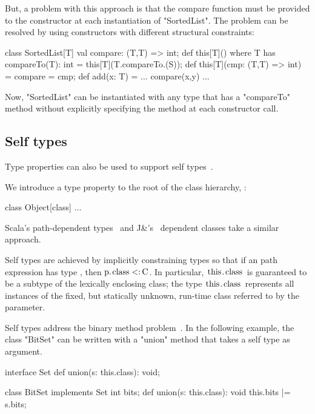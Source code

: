 \documentclass[preprint,nocopyrightspace,9pt]{sigplanconf}
\begin{document}
But, a problem with this approach is that the compare function must be
provided to the constructor at each instantiation of \xcd"SortedList".
The problem can be resolved by using constructors with different
structural constraints:
\begin{xten}
class SortedList[T] {
    val compare: (T,T) => int;
    def this[T]() where T has compareTo(T): int = {
        this[T](T.compareTo.(S));
    }
    def this[T](cmp: (T,T) => int) = { compare = cmp; }
    def add(x: T) = { ... compare(x,y) ... }
}
\end{xten}
Now, \xcd"SortedList" can be instantiated with any type that has
a \xcd"compareTo"
method without explicitly specifying the method at each constructor call.



\subsection{Self types}
\label{sec:self}

Type properties can also be used to support self
types~\cite{bruce-binary,bsg95}.

We introduce a 
type property  to the root of the class hierarchy, :
\begin{xtenmath}
class Object[class] { $\dots$ }
\end{xtenmath}
Scala's path-dependent types~\cite{scala} and J\&'s~\cite{nqm06}
dependent classes
take a similar approach.

\noindent
Self types are achieved by
implicitly constraining types so that if an path expression 
has type , then
$\Xcd{p}.\Xcd{class} \subtype \Xcd{C}$.  In particular,
$\Xcd{this}.\Xcd{class}$ is guaranteed to be a subtype
of the lexically enclosing class; the type
$\Xcd{this}.\Xcd{class}$ represents all instances of the fixed,
but statically unknown, run-time class referred to by the 
parameter.

Self types address the binary method problem~\cite{bruce-binary}.
In the following
example, the class \xcd"BitSet" can be written with a
\xcd"union" method that takes a self type as argument.

\begin{xtenmath}
interface Set {
    def union(s: this.class): void;
}

class BitSet implements Set {
    int bits;
    def union(s: this.class): void {
        this.bits |= s.bits;
    }
}
\end{xtenmath}
\end{document}
